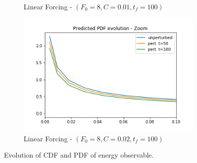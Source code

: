 \documentclass{article}
\begin{document}
\begin{figure}[!ht]
\begin{subfigure}[b]{0.48\textwidth}
		\caption{Linear Forcing - $(F_0=8, C=0.01, t_f=100)$}
		\label{fig:pred_pdf_zoom_energy_bin_00q_10q_LF_8_001_0_100}
	\end{subfigure}%
	\begin{subfigure}[b]{0.48\textwidth}
		\includegraphics[width=1\linewidth]{fig/pred_pdf_zoom_energy_bin_00q_10q_LF_8_002_0_100.png}
		\caption{Linear Forcing - $(F_0=8, C=0.02, t_f=100)$}
		\label{fig:pred_pdf_zoom_energy_bin_00q_10q_LF_8_002_0_100}
	\end{subfigure}
	\caption{Evolution of CDF and PDF of energy observable.}
	\label{fig:pred_energy_cdf_pdf}
\end{figure}
\end{document}
